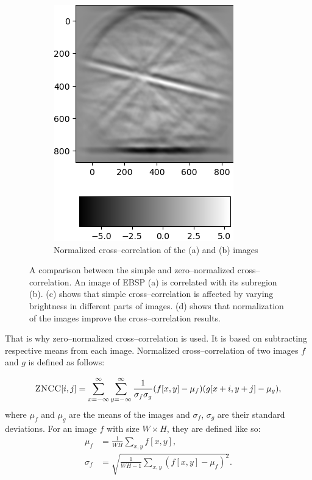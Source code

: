 \begin{figure}
\begin{subfigure}{.49\textwidth}
		\includegraphics[width=\linewidth]{img/normalized_corr}
		\caption{Normalized cross--correlation of the (a) and (b) images}
		\label{normalized-cross}
	\end{subfigure}
	
	\caption{A comparison between the simple and zero--normalized cross--correlation. An image of EBSP (a) is correlated with its subregion (b). (c) shows that simple cross--correlation is affected by varying brightness in different parts of images. (d) shows that normalization of the images improve the cross--correlation results.}
\end{figure}

That is why zero--normalized cross--correlation is used. It is based on subtracting respective means from each image. Normalized cross--correlation of two images $f$ and $g$ is defined as follows:

\[
\textsc{ZNCC}[i,j] = \sum_{x=-\infty}^{\infty}\sum_{y=-\infty}^{\infty} \frac{1}{\sigma_f \sigma_g}(f[x,y] - \mu_f)(g[x+i,y+j] - \mu_g),
\]  
where $\mu_f$ and $\mu_g$ are the means of the images and $\sigma_f$, $\sigma_g$ are their standard deviations. For an image $f$ with size $W \times H$, they are defined like so:
\begin{align*}
\mu_f &= \frac{1}{WH} \sum_{x,y}{}f[x,y], \\
\sigma_f &= \sqrt{\frac{1}{WH-1} \sum_{x,y}(f[x,y]-\mu_f)^2}.
\end{align*}


